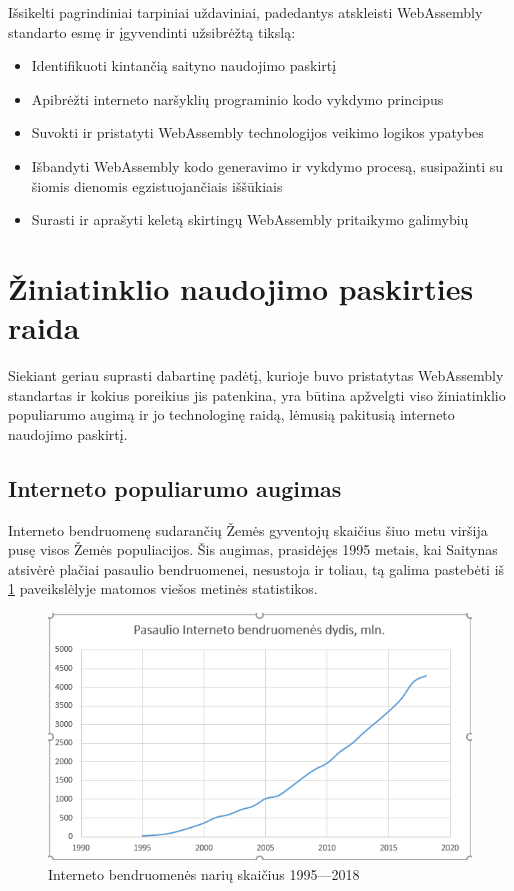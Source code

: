 \documentclass{VUMIFPSkursinis}
\begin{document}
Išsikelti pagrindiniai tarpiniai uždaviniai, padedantys atskleisti WebAssembly standarto esmę ir įgyvendinti užsibrėžtą tikslą:
\begin{itemize}
    \item Identifikuoti kintančią saityno naudojimo paskirtį
    \item Apibrėžti interneto naršyklių programinio kodo vykdymo principus
    \item Suvokti ir pristatyti WebAssembly technologijos veikimo logikos ypatybes
    \item Išbandyti WebAssembly kodo generavimo ir vykdymo procesą, susipažinti su šiomis dienomis egzistuojančiais iššūkiais
    \item Surasti ir aprašyti keletą skirtingų WebAssembly pritaikymo galimybių
\end{itemize}

\section{Žiniatinklio naudojimo paskirties raida}

Siekiant geriau suprasti dabartinę padėtį, kurioje buvo pristatytas WebAssembly standartas ir kokius poreikius jis patenkina, yra būtina apžvelgti viso žiniatinklio populiarumo augimą ir jo technologinę raidą, lėmusią pakitusią interneto naudojimo paskirtį.

\subsection{Interneto populiarumo augimas}

Interneto bendruomenę sudarančių Žemės gyventojų skaičius šiuo metu viršija pusę visos Žemės populiacijos. Šis augimas, prasidėjęs 1995 metais, kai Saitynas atsivėrė plačiai pasaulio bendruomenei, nesustoja ir toliau, tą galima pastebėti iš \ref{fig:internet_usage} paveikslėlyje matomos viešos metinės statistikos.

\begin{figure}[h!]
  \includegraphics[scale=1]{interneto_naudojimo_statistika.png}
  \caption{Interneto bendruomenės narių skaičius 1995—2018 \cite{IWS19}}
  \label{fig:internet_usage}
\end{figure}
\end{document}
